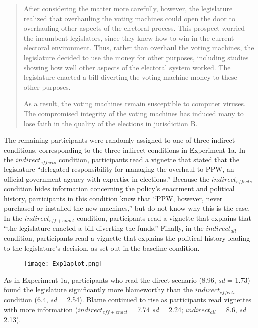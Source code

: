 \documentclass{article}
\begin{document}
\begin{quote}

After considering the matter more carefully, however, the legislature realized that overhauling the voting machines could open the door to overhauling other aspects of the electoral process. This prospect worried the incumbent legislators, since they knew how to win in the current electoral environment. Thus, rather than overhaul the voting machines, the legislature decided to use the money for other purposes, including studies showing how well other aspects of the electoral system worked. The legislature enacted a bill diverting the voting machine money to these other purposes. 

As a result, the voting machines remain susceptible to computer viruses. The compromised integrity of the voting machines has induced many to lose faith in the quality of the elections in jurisdiction B. 
 
\end{quote}

The remaining participants were randomly assigned to one of three indirect conditions, corresponding to the three indirect conditions in Experiment 1a. In the $indirect_{effects}$ condition, participants read a vignette that stated that the legislature ``delegated responsibility for managing the overhaul to PPW, an official government agency with expertise in elections.'' Because the $indirect_{effects}$ condition hides information concerning the policy's enactment and political history, participants in this condition know that ``PPW, however, never purchased or installed the new machines,'' but do not know why this is the case. In the $indirect_{eff+enact}$ condition, participants read a vignette that explains that  ``the legislature enacted a bill diverting the funds.'' Finally, in the $indirect_{all}$ condition, participants read a vignette that explains the political history leading to the legislature's decision, as set out in the baseline condition. 


\begin{figure}[htb]
\begin{center}
\texttt{[image: Exp1aplot.png]}
\end{center}
\end{figure}

As in Experiment 1a, participants who read the direct scenario (8.96, \emph{sd} = 1.73) found the legislature significantly more blameworthy than the $indirect_{effects}$ condition (6.4, \emph{sd} = 2.54). Blame continued to rise as participants read vignettes with more information ($indirect_{eff+enact}$ = 7.74 \emph{sd} = 2.24; $indirect_{all}$ = 8.6, \emph{sd} = 2.13).
\end{document}
